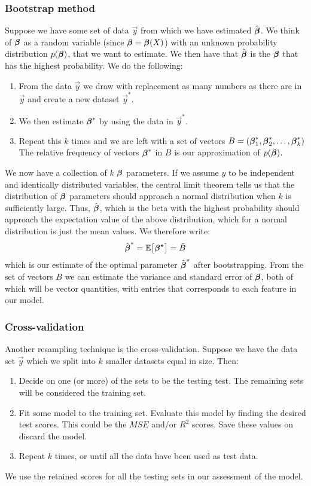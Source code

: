 \subsubsection{Bootstrap method}\label{sec:bootstrap}
Suppose we have some set of data $\vec{y}$ from which we have estimated $\hat{\boldsymbol{\beta}}$. We think of $\boldsymbol{\beta}$ as a random variable (since $\boldsymbol{\beta}=\boldsymbol{\beta}(X)$) with an unknown probability distribution $p(\mathbf{\boldsymbol{\beta}})$, that we want to estimate. We then have that $\hat{\boldsymbol{\beta}}$ is the $\boldsymbol{\beta}$ that has the highest probability. We do the following:
\begin{enumerate}
    \item From the data $\vec{y}$ we draw with replacement as many numbers as there are in $\vec{y}$ and create a new dataset $\vec{y}^*$.
    \item We then estimate $\boldsymbol{\beta}^*$ by using the data in $\vec{y}^*$. 
    \item Repeat this $k$ times and we are left with a set of vectors $B = (\boldsymbol{\beta}^*_1, \boldsymbol{\beta}^*_2, \dots, \boldsymbol{\beta}^*_k)$ The relative frequency of vectors $\boldsymbol{\beta}^*$ in $B$ is our approximation of $p(\boldsymbol{\beta})$. 
\end{enumerate}
We now have a collection of $k$ $\boldsymbol{\beta}$ parameters. If we assume $y$ to be independent and identically distributed variables, the central limit theorem tells us that the distribution of $\boldsymbol{\beta}$ parameters should approach a normal distribution when $k$ is sufficiently large. Thus, $\hat{\boldsymbol{\beta}}$, which is the beta with the highest probability should approach the expectation value of the above distribution, which for a normal distribution is just the mean values. We therefore write:
\begin{align*}
    \hat{\boldsymbol{\beta}}^* = \mathbb{E}\big[\boldsymbol{\beta^*}\big] = \bar{B} 
\end{align*}
which is our estimate of the optimal parameter $\hat{\boldsymbol{\beta}}^*$ after bootstrapping. From the set of vectors $B$ we can estimate the variance and standard error of $\boldsymbol{\beta}$, both of which will be vector quantities, with entries that corresponds to each feature in our model. 

\subsubsection{Cross-validation}\label{sec:k_fold}
Another resampling technique is the cross-validation. Suppose we have the data set $\vec{y}$ which we split into $k$ smaller datasets equal in size. Then:
\begin{enumerate}
    \item Decide on one (or more) of the sets to be the testing test. The remaining sets will be considered the training set.
    \item Fit some model to the training set. Evaluate this model by finding the desired test scores. This could be the $MSE$ and/or $R^2$ scores. Save these values on discard the model. 
    \item Repeat $k$ times, or until all the data have been used as test data. 
\end{enumerate}
We use the retained scores for all the testing sets in our assessment of the model. 
